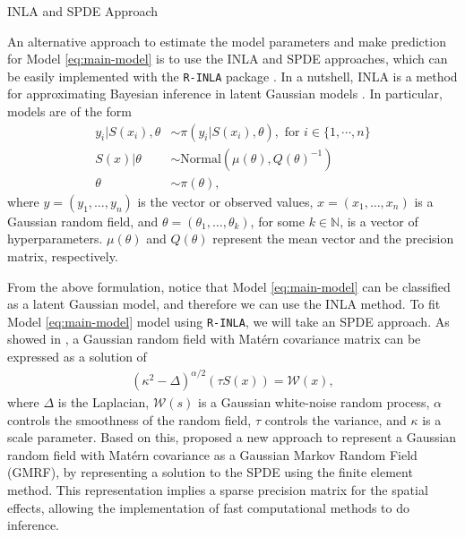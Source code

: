 \documentclass[12pt]{beamer}
\begin{document}
\begin{frame}[t]
\begin{columns}[t]
\begin{column}{0.30\textwidth}
			{\large \textcolor{title-fg}{INLA and SPDE Approach}} \vspace{18pt}
			
			An alternative approach to estimate the model parameters and make prediction for Model \eqref{eq:main-model} is to use the INLA and SPDE approaches, which can be easily implemented with the \texttt{R-INLA} package \cite{rue2009approximate}.
			In a nutshell, INLA is a method for approximating Bayesian inference in latent Gaussian models \cite{moraga2019geospatial}. In particular, models are of the form
			\begin{align*}
				y_i|S(x_i), \theta &\sim \pi(y_i|S(x_i), \theta), \text{ for } i \in \{1, \cdots, n\} \\
				S(x)|\theta &\sim \text{Normal}(\mu(\theta), Q(\theta)^{-1}) \\
				\theta &\sim \pi(\theta),
			\end{align*}
			where $y = (y_1, \ldots, y_n)$ is the vector or observed values, $x = (x_1, \ldots, x_n)$ is a Gaussian random field, and $\theta = (\theta_1, \ldots, \theta_k)$, for some $k \in \mathbb{N}$, is a vector of hyperparameters. $\mu(\theta)$ and $Q(\theta)$ represent the mean vector and the precision matrix, respectively.\vspace{18pt}
			
			From the above formulation, notice that Model \eqref{eq:main-model} can be classified as a latent Gaussian model, and therefore we can use the INLA method. To fit Model \eqref{eq:main-model} model using \texttt{R-INLA}, we will take an SPDE approach. As showed in \cite{whittle1963stochastic}, a Gaussian random field with Mat\'{e}rn covariance matrix can be expressed as a solution of
			\begin{align*}
				(\kappa^2 - \Delta)^{\alpha/2}(\tau S(x)) = \mathcal{W}(x),
			\end{align*} 
			where $\Delta$ is the Laplacian, $\mathcal{W}(s)$ is a Gaussian white-noise random process, $\alpha$ controls the smoothness of the random field, $\tau$ controls the variance, and $\kappa$ is a scale parameter. Based on this, \cite{lindgren2011explicit} proposed a new approach to represent a Gaussian random field with Mat\'{e}rn covariance as a Gaussian Markov Random Field {\normalfont(GMRF)}, by representing a solution to the SPDE using the finite element method. This representation implies a sparse precision matrix for the spatial effects, allowing the implementation of fast computational methods to do inference.
			

\end{column}
\end{columns}
\end{frame}
\end{document}

